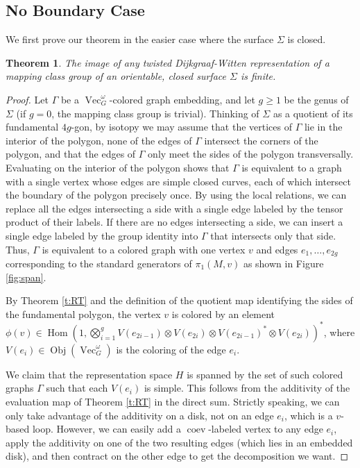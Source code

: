 \documentclass{ws-jktr}
\newtheorem{thm}{Theorem}[section]
\DeclareMathOperator{\Vect}{Vec}
\DeclareMathOperator{\Hom}{Hom}
\DeclareMathOperator{\Obj}{Obj}
\DeclareMathOperator{\coev}{coev}
\newcommand{\one}{1}
\newcommand{\Si}{\Sigma}
\begin{document}
\subsection{No Boundary Case}

We first prove our theorem in the easier case where the surface $\Si$ is closed.  

\begin{thm}\label{thm:closed}
The image of any twisted Dijkgraaf-Witten representation of a mapping class group of an orientable, closed surface $\Si$ is finite.
\end{thm}

\begin{proof}
Let $\Gamma$ be a $\Vect_G^\omega$-colored graph embedding, and let $g \ge 1$ be the genus of $\Si$ (if $g = 0$, the mapping class group is trivial). Thinking of $\Si$ as a quotient of its fundamental $4g$-gon, by isotopy we may assume that the vertices of $\Gamma$ lie in the interior of the polygon, none of the edges of $\Gamma$ intersect the corners of the polygon, and that the edges of $\Gamma$ only meet the sides of the polygon transversally.  Evaluating on the interior of the polygon shows that $\Gamma$ is equivalent to a graph with a single vertex whose edges are simple closed curves, each of which intersect the boundary of the polygon precisely once.  By using the local relations, we can replace all the edges intersecting a side with a single edge labeled by the tensor product of their labels.  If there are no edges intersecting a side, we can insert a single edge labeled by the group identity into $\Gamma$ that intersects only that side.  Thus, $\Gamma$ is equivalent to a colored graph with one vertex $v$ and edges $e_1, \ldots, e_{2g}$ corresponding to the standard generators of $\pi_1(M,v)$ as shown in Figure \ref{fig:span}.

By Theorem \ref{t:RT} and the definition of the quotient map identifying the sides of the fundamental polygon, the vertex $v$ is colored by an element $\phi(v) \in \Hom (\one, \bigotimes_{i=1}^g V(e_{2i-1}) \otimes V(e_{2i})  \otimes V(e_{2i-1})^* \otimes V(e_{2i}))^*$, where $V(e_i) \in \Obj(\Vect_G^\omega)$ is the coloring of the edge $e_i$.   

We claim that the representation space $H$ is spanned by the set of such colored graphs $\Gamma$ such that each $V(e_i)$ is simple. This follows from the additivity of the evaluation map of Theorem \ref{t:RT} in the direct sum.   Strictly speaking, we can only take advantage of the additivity on a disk, not on an edge $e_i$, which is a $v$-based loop. However, we can easily add a $\coev$-labeled vertex to any edge $e_i$, apply the additivity on one of the two resulting edges (which lies in an embedded disk), and then contract on the other edge to get the decomposition we want.


\end{proof}
\end{document}
